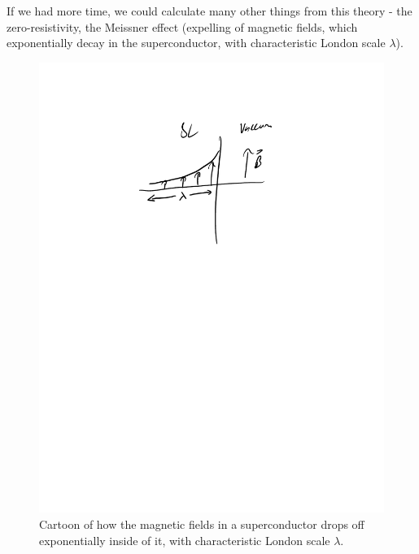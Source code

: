 If we had more time, we could calculate many other things from this theory - the zero-resistivity, the Meissner effect (expelling of magnetic fields, which exponentially decay in the superconductor, with characteristic London scale $\lambda$).

\begin{figure}[htbp]
    \centering
    \includegraphics[scale=0.7]{Images/fig-meissener.pdf}
    \caption{Cartoon of how the magnetic fields in a superconductor drops off exponentially inside of it, with characteristic London scale $\lambda$.}
    \label{fig-meissener}
\end{figure}